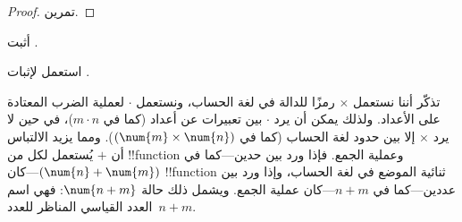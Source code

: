 \documentclass[../../../include/open-logic-section]{subfiles}
\begin{document}
\begin{proof} تمرين. \end{proof}

\begin{prob}
أثبت .
\end{prob}

\begin{prob}
استعمل  لإثبات
.
\end{prob}

\begin{explain}
  تذكّر أننا نستعمل $\times$ رمزًا للدالة في لغة الحساب، ونستعمل
  $\cdot$ لعملية الضرب المعتادة على الأعداد. ولذلك يمكن أن يرد
  $\cdot$ بين تعبيرات عن أعداد (كما في $m\cdot n$)، في حين لا يرد
  $\times$ إلا بين حدود لغة الحساب (كما في
  $(\num{m}\times\num{n})$). ومما يزيد الالتباس أن $+$ يُستعمل لكل من
  !!{function} وعملية الجمع. فإذا ورد بين حدين---كما في
  $(\num{n}+\num{m})$---كان !!{function} ثنائية الموضع في لغة
  الحساب، وإذا ورد بين عددين---كما في $n+m$---كان عملية الجمع. ويشمل
  ذلك حالة $\num{n+m}$: فهي اسم العدد القياسي المناظر للعدد~$n+m$.
\end{explain}
\end{document}
